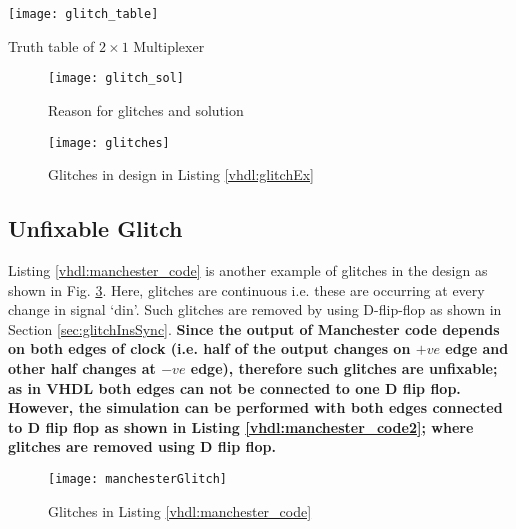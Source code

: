 \begin{table}[!h]
	\centering
	\texttt{[image: glitch\_table]}
	\caption{Truth table of $2 \times 1$ Multiplexer}
	\label{tbl:glitch_table}
\end{table}

\begin{figure}[!h]
	\centering
	\texttt{[image: glitch\_sol]}
	\caption{Reason for glitches and solution}
	\label{fig:glitch_sol}
\end{figure}

\begin{figure}[!h]
	\centering
	\texttt{[image: glitches]}
	\caption{Glitches in design in Listing \ref{vhdl:glitchEx}}
	\label{fig:glitches}
\end{figure}



\subsection{Unfixable Glitch}
Listing \ref{vhdl:manchester_code} is another example of glitches in the design as shown in Fig. \ref{fig:manchesterGlitch}. Here, glitches are continuous i.e. these are occurring at every change in signal `din'. Such glitches are removed by using D-flip-flop as shown in Section \ref{sec:glitchInsSync}. \textbf{Since the output of Manchester code depends on both edges of clock (i.e. half of the output changes on $+ve$ edge and other half changes at $-ve$ edge), therefore such glitches are unfixable; as in VHDL both edges can not be connected to one D flip flop. However, the simulation can be performed with both edges connected to D flip flop as shown in Listing \ref{vhdl:manchester_code2}; where glitches are removed using D flip flop.}

\begin{figure}[!h]
	\centering
	\texttt{[image: manchesterGlitch]}
	\caption{Glitches in Listing \ref{vhdl:manchester_code}}
	\label{fig:manchesterGlitch}
\end{figure}





